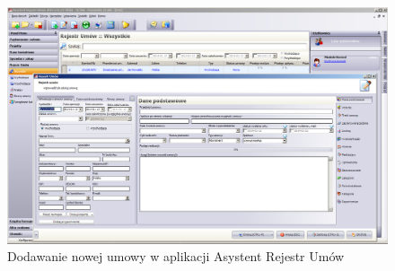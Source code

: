 \begin{figure}[tdh]
    \begin{center}
	\includegraphics[scale=.6, angle=-90]{img/asystent-rejestr-umow.png}
	\caption{Dodawanie nowej umowy w aplikacji Asystent Rejestr Umów}
	\label{asystent-rejestr-umow}
    \end{center}
\end{figure}

